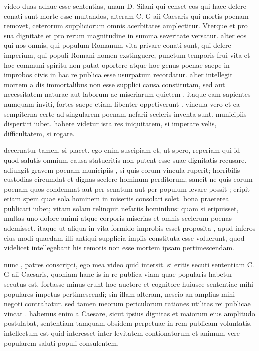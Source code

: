  video duas adhuc esse sententias, unam D. Silani qui censet eos qui haec delere conati sunt morte esse multandos, alteram C. G aii Caesaris qui mortis poenam removet, ceterorum suppliciorum omnis acerbitates amplectitur. Vterque et pro sua dignitate et pro rerum magnitudine in summa severitate versatur. alter eos qui nos omnis, qui populum Romanum vita privare conati sunt, qui delere imperium, qui populi Romani nomen exstinguere, punctum temporis frui vita et hoc communi spiritu non putat oportere atque hoc genus poenae saepe in improbos civis in hac re publica esse usurpatum recordatur. alter intellegit mortem a dis immortalibus non esse supplici causa constitutam, sed aut necessitatem naturae aut laborum ac miseriarum quietem . itaque eam sapientes numquam inviti, fortes saepe etiam libenter oppetiverunt . vincula vero et ea sempiterna certe ad singularem poenam nefarii sceleris inventa sunt. municipiis dispertiri iubet. habere videtur ista res iniquitatem, si imperare velis, difficultatem, si rogare.

 decernatur tamen, si placet. ego enim suscipiam et, ut spero, reperiam qui id quod salutis omnium causa statueritis non putent esse suae dignitatis recusare. adiungit gravem poenam municipiis , si quis eorum vincula ruperit; horribilis custodias circumdat et dignas scelere hominum perditorum; sancit ne quis eorum poenam quos condemnat aut per senatum aut per populum levare possit ; eripit etiam spem quae sola hominem in miseriis consolari solet. bona praeterea publicari iubet; vitam solam relinquit nefariis hominibus: quam si eripuisset, multas uno dolore animi atque corporis miserias et omnis scelerum poenas ademisset. itaque ut aliqua in vita formido improbis esset proposita , apud inferos eius modi quaedam illi antiqui supplicia impiis constituta esse voluerunt, quod videlicet intellegebant his remotis non esse mortem ipsam pertimescendam.

 nunc , patres conscripti, ego mea video quid intersit. si eritis secuti sententiam C. G aii Caesaris, quoniam hanc is in re publica viam quae popularis habetur secutus est, fortasse minus erunt hoc auctore et cognitore huiusce sententiae mihi populares impetus pertimescendi; sin illam alteram, nescio an amplius mihi negoti contrahatur. sed tamen meorum periculorum rationes utilitas rei publicae vincat . habemus enim a Caesare, sicut ipsius dignitas et maiorum eius amplitudo postulabat, sententiam tamquam obsidem perpetuae in rem publicam voluntatis. intellectum est quid interesset inter levitatem contionatorum et animum vere popularem saluti populi consulentem.

